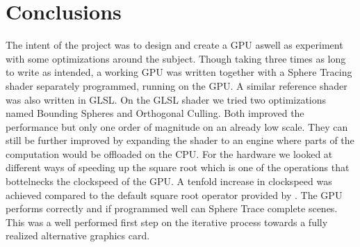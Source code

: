 \chapter{Conclusions}

The intent of the project was to design and create a GPU aswell as experiment
with some optimizations around the subject. Though taking three times as long
to write as intended, a working GPU was written together with a Sphere Tracing
shader separately programmed, running on the GPU. A similar reference shader
was also written in GLSL. On the GLSL shader we tried two optimizations named
Bounding Spheres and Orthogonal Culling. Both improved the performance but only
one order of magnitude on an already low scale. They can still be further
improved by expanding the shader to an engine where parts of the computation
would be offloaded on the CPU. For the hardware we looked at different ways of
speeding up the square root which is one of the operations that bottelnecks the
clockspeed of the GPU. A tenfold increase in clockspeed was achieved compared
to the default square root operator provided by \clash. The GPU performs
correctly and if programmed well can Sphere Trace complete scenes. This was a
well performed first step on the iterative process towards a fully realized
alternative graphics card.

